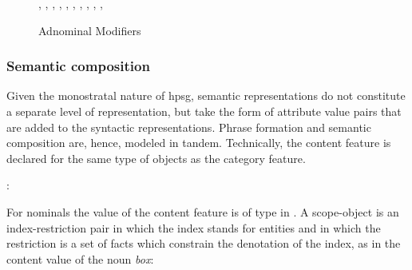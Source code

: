 \documentclass[output=paper]{langsci/langscibook}
\begin{document}
\begin{figure}
\begin{center}
\footnotesize
\tree
{,
  {,
    {}},
  {,
    {,
      {,
        {}},
      {,
        {}}},
    {,
      {}}}}
\caption{\label{lea} Adnominal Modifiers}
\normalsize
\end{center}
\end{figure}
 

\subsubsection{Semantic composition}


Given the monostratal nature of {\sc hpsg}, semantic representations 
do not constitute a separate level of representation, but take the form 
of attribute value pairs that are added to the syntactic representations.   
Phrase formation and semantic composition are, hence, modeled in tandem.  
Technically, the {\sc content} feature is declared for the same type of objects 
as the {\sc category} feature. 

\begin{exe} 
\ex  {}: \begin{avm} 
                   \end{avm} 
\end{exe} 

\noindent 
For nominals the value of the {\sc content} feature is of type  
in \citet{GS00}. 
A scope-object is an index-restriction pair in which the index stands for 
entities and in which the restriction is a set of facts which constrain the 
denotation of the index, as in the {\sc content} value of the noun \emph{box}:    
\end{document}
